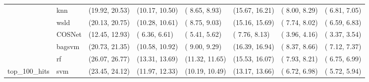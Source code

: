\begin{table}[H]
{\begin{tabular}{llllllll}
 & knn & (19.92, 20.53) & (10.17, 10.50) & ( 8.65,  8.93) & (15.67, 16.21) & ( 8.00,  8.29) & ( 6.81,  7.05)\\

 & wsld & (20.13, 20.75) & (10.28, 10.61) & ( 8.75,  9.03) & (15.16, 15.69) & ( 7.74,  8.02) & ( 6.59,  6.83)\\

 & COSNet & (12.45, 12.93) & ( 6.36,  6.61) & ( 5.41,  5.62) & ( 7.76,  8.13) & ( 3.96,  4.16) & ( 3.37,  3.54)\\

 & bagsvm & (20.73, 21.35) & (10.58, 10.92) & ( 9.00,  9.29) & (16.39, 16.94) & ( 8.37,  8.66) & ( 7.12,  7.37)\\

 & rf & (26.07, 26.77) & (13.31, 13.69) & (11.32, 11.65) & (15.53, 16.07) & ( 7.93,  8.21) & ( 6.75,  6.99)\\

\multirow{-15}{*}{\raggedright\arraybackslash top\_100\_hits} & svm & (23.45, 24.12) & (11.97, 12.33) & (10.19, 10.49) & (13.17, 13.66) & ( 6.72,  6.98) & ( 5.72,  5.94)\\
\bottomrule
\end{tabular}}
\end{table}
